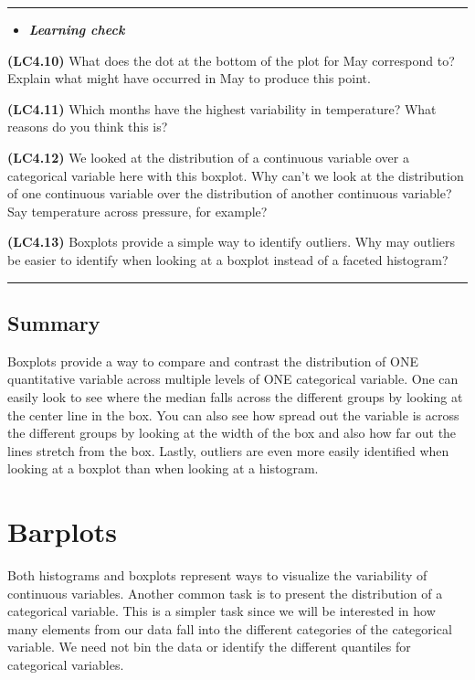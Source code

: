 \documentclass[]{tufte-book}
\newenvironment{rmdblock}[1]
  {\begin{shaded*}
  \begin{itemize}
  \renewcommand{\labelitemi}{
    \raisebox{-.7\height}[0pt][0pt]{
    }
  }
  \item
  }
  {
  \end{itemize}
  \end{shaded*}
  }
\newenvironment{learncheck}
  {\begin{rmdblock}{warning}}
  {\end{rmdblock}}
\begin{document}
\begin{center}\rule{\linewidth}{\linethickness}\end{center}

\begin{learncheck}
\textbf{\emph{Learning check}}
\end{learncheck}

\textbf{(LC4.10)} What does the dot at the bottom of the plot for May
correspond to? Explain what might have occurred in May to produce this
point.

\textbf{(LC4.11)} Which months have the highest variability in
temperature? What reasons do you think this is?

\textbf{(LC4.12)} We looked at the distribution of a continuous variable
over a categorical variable here with this boxplot. Why can't we look at
the distribution of one continuous variable over the distribution of
another continuous variable? Say temperature across pressure, for
example?

\textbf{(LC4.13)} Boxplots provide a simple way to identify outliers.
Why may outliers be easier to identify when looking at a boxplot instead
of a faceted histogram?

\begin{center}\rule{\linewidth}{\linethickness}\end{center}

\subsection{Summary}\label{summary-1}

Boxplots provide a way to compare and contrast the distribution of ONE
quantitative variable across multiple levels of ONE categorical
variable. One can easily look to see where the median falls across the
different groups by looking at the center line in the box. You can also
see how spread out the variable is across the different groups by
looking at the width of the box and also how far out the lines stretch
from the box. Lastly, outliers are even more easily identified when
looking at a boxplot than when looking at a histogram.

\section{Barplots}\label{barplots}

Both histograms and boxplots represent ways to visualize the variability
of continuous variables. Another common task is to present the
distribution of a categorical variable. This is a simpler task since we
will be interested in how many elements from our data fall into the
different categories of the categorical variable. We need not bin the
data or identify the different quantiles for categorical variables.
\end{document}
